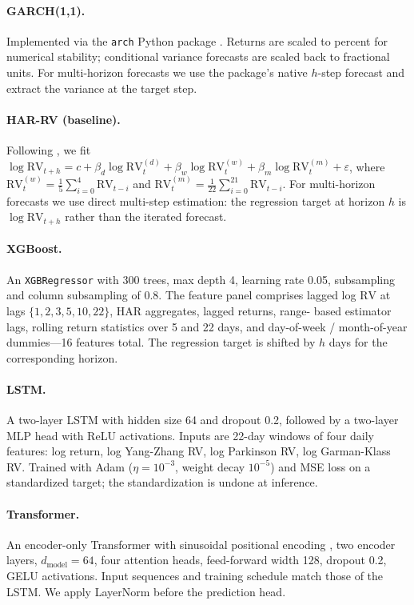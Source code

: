 \documentclass[11pt]{article}
\begin{document}
\paragraph{GARCH(1,1).} Implemented via the \texttt{arch} Python
package \citep{sheppard2023arch}. Returns are scaled to percent for
numerical stability; conditional variance forecasts are scaled back
to fractional units. For multi-horizon forecasts we use the package's
native $h$-step forecast and extract the variance at the target step.

\paragraph{HAR-RV (baseline).} Following \citet{corsi2009}, we fit
$\log \mathrm{RV}_{t+h} = c + \beta_d \log \mathrm{RV}^{(d)}_t + \beta_w \log \mathrm{RV}^{(w)}_t + \beta_m \log \mathrm{RV}^{(m)}_t + \varepsilon$,
where $\mathrm{RV}^{(w)}_t = \tfrac{1}{5} \sum_{i=0}^{4} \mathrm{RV}_{t-i}$
and $\mathrm{RV}^{(m)}_t = \tfrac{1}{22} \sum_{i=0}^{21} \mathrm{RV}_{t-i}$.
For multi-horizon forecasts we use direct multi-step estimation:
the regression target at horizon $h$ is $\log \mathrm{RV}_{t+h}$
rather than the iterated forecast.

\paragraph{XGBoost.} An \texttt{XGBRegressor} with 300 trees, max
depth 4, learning rate 0.05, subsampling and column subsampling
of 0.8. The feature panel comprises lagged log $\mathrm{RV}$ at
lags $\{1,2,3,5,10,22\}$, HAR aggregates, lagged returns, range-
based estimator lags, rolling return statistics over 5 and 22 days,
and day-of-week / month-of-year dummies---16 features total. The
regression target is shifted by $h$ days for the corresponding
horizon.

\paragraph{LSTM.} A two-layer LSTM with hidden size 64 and dropout
0.2, followed by a two-layer MLP head with ReLU activations. Inputs
are 22-day windows of four daily features: log return, log
Yang-Zhang RV, log Parkinson RV, log Garman-Klass RV. Trained with
Adam ($\eta=10^{-3}$, weight decay $10^{-5}$) and MSE loss on a
standardized target; the standardization is undone at inference.

\paragraph{Transformer.} An encoder-only Transformer with
sinusoidal positional encoding \citep{vaswani2017attention}, two
encoder layers, $d_{\mathrm{model}}=64$, four attention heads,
feed-forward width 128, dropout 0.2, GELU activations. Input
sequences and training schedule match those of the LSTM. We apply
LayerNorm before the prediction head.
\end{document}
